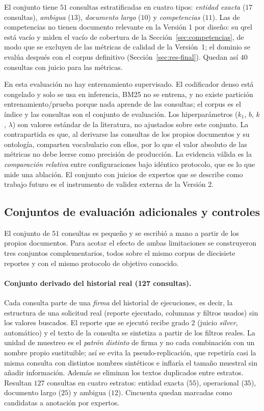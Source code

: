 \documentclass[11pt,letterpaper]{article}
\numberwithin{equation}{section}
\begin{document}
El conjunto tiene $51$ consultas estratificadas en cuatro tipos: \emph{entidad exacta} ($17$ consultas), \emph{ambigua} ($13$), \emph{documento largo} ($10$) y \emph{competencias} ($11$). Las de competencias no tienen documento relevante en la Versión 1 por diseño: su qrel está vacío y miden el vacío de cobertura de la Sección~\ref{sec:competencias}, de modo que se excluyen de las métricas de calidad de la Versión~1; el dominio se evalúa después con el corpus definitivo (Sección~\ref{sec:res-final}). Quedan así $40$ consultas con juicio para las métricas.

En esta evaluación no hay entrenamiento supervisado. El codificador denso está congelado y solo se usa en inferencia, BM25 no se entrena, y no existe partición entrenamiento/prueba porque nada aprende de las consultas; el corpus es el índice y las consultas son el conjunto de evaluación. Los hiperparámetros ($k_1$, $b$, $k$, $\lambda$) son valores estándar de la literatura, no ajustados sobre este conjunto. La contrapartida es que, al derivarse las consultas de los propios documentos y su ontología, comparten vocabulario con ellos, por lo que el valor absoluto de las métricas no debe leerse como precisión de producción. La evidencia válida es la \emph{comparación relativa} entre configuraciones bajo idéntico protocolo, que es lo que mide una ablación. El conjunto con juicios de expertos que se describe como trabajo futuro es el instrumento de validez externa de la Versión 2.

\subsection{Conjuntos de evaluación adicionales y controles}
\label{sec:conjuntos}
El conjunto de $51$ consultas es pequeño y se escribió a mano a partir de los propios documentos. Para acotar el efecto de ambas limitaciones se construyeron tres conjuntos complementarios, todos sobre el mismo corpus de diecisiete reportes y con el mismo protocolo de objetivo conocido.

\paragraph{Conjunto derivado del historial real (127 consultas).} Cada consulta parte de una \emph{firma} del historial de ejecuciones, es decir, la estructura de una solicitud real (reporte ejecutado, columnas y filtros usados) sin los valores buscados. El reporte que se ejecutó recibe grado $2$ (juicio \textit{silver}, automático) y el texto de la consulta se sintetiza a partir de los filtros reales. La unidad de muestreo es el \emph{patrón distinto} de firma y no cada combinación con un nombre propio sustituible; así se evita la pseudo-replicación, que repetiría casi la misma consulta con distintos nombres sintéticos e inflaría el tamaño muestral sin añadir información. Además se eliminan los textos duplicados entre estratos. Resultan $127$ consultas en cuatro estratos: entidad exacta ($55$), operacional ($35$), documento largo ($25$) y ambigua ($12$). Cincuenta quedan marcadas como candidatas a anotación por expertos.
\end{document}
